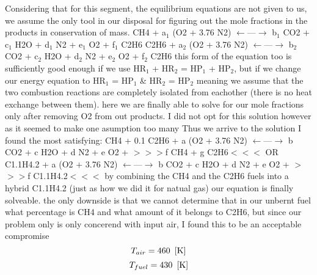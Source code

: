 \documentclass[10pt,fleqn]{article}
\begin{document}
\vspace{0.04in}
\noindent
\vspace{0.1 in}
\rm Considering that for this segment, the equilibrium equations are not given to us, we assume the only tool in our disposal for figuring out the mole fractions in the products in conservation of mass.\newline
  CH4  +  a$_{1}$ (O2 + 3.76 N2)   $\leftarrow$---$\rightarrow$  b$_{1}$ CO2  +  c$_{1}$ H2O  +  d$_{1}$ N2  +  e$_{1}$ O2  +  f$_{1}$ C2H6 C2H6  +  a$_{2}$ (O2 + 3.76 N2)   $\leftarrow$---$\rightarrow$  b$_{2}$ CO2  +  c$_{2}$ H2O  +  d$_{2}$ N2  +  e$_{2}$ O2  +  f$_{2}$ C2H6\newline
this form of the equation too is sufficiently good enough if we use HR$_{1}$ + HR$_{2}$ = HP$_{1}$ + HP$_{2}$, but if we change our energy equation to HR$_{1}$ = HP$_{1}$ \& HR$_{2}$ = HP$_{2}$ meaning we assume that the two combustion reactions are completely isolated from eachother (there is no heat exchange between them). here we are finally able to solve for our mole fractions only after removing O2 from out products. I did not opt for this solution however as it seemed to make one asumption too many\newline
Thus we arrive to the solution I found the most satisfying:\newline
  CH4  + 0.1 C2H6 +  a (O2 + 3.76 N2)   $\leftarrow$---$\rightarrow$  b CO2  +  c H2O  +  d N2  +  e O2  +  $>$$>$$>$f CH4  +  g C2H6$<$$<$$<$\newline
OR\newline
C1.1H4.2  +  a (O2 + 3.76 N2)   $\leftarrow$---$\rightarrow$  b CO2  +  c H2O  +  d N2  +  e O2  +  $>$$>$$>$f C1.1H4.2$<$$<$$<$\newline
by combining the CH4 and the C2H6 fuels into a hybrid C1.1H4.2 (just as how we did it for natual gas) our equation is finally solveable. the only downside is that we cannot determine that in our unbernt fuel what percentage is CH4 and what amount of it belongs to C2H6, but since our problem only is only concerend with input air, I found this to be an acceptable compromise
\begin{equation}
\label{EES Eqn:4}
T_{air} = 460   \   \left[ \rm K \right] 
\end{equation}
\rm
\begin{equation}
\label{EES Eqn:5}
T_{fuel} = 430   \   \left[ \rm K \right] 
\end{equation}
\end{document}
